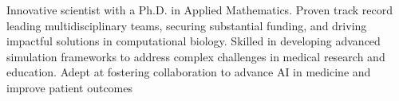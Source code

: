 %
%
%

\par{
Innovative scientist with a Ph.D. in Applied Mathematics. Proven track record leading multidisciplinary teams, securing substantial funding, and driving impactful solutions in computational biology. Skilled in developing advanced simulation frameworks to address complex challenges in medical research and education. Adept at fostering collaboration to advance AI in medicine and improve patient outcomes 
}
